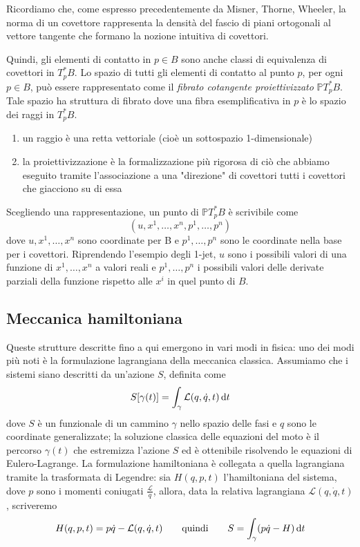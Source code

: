 \begin{remark}
    Ricordiamo che, come espresso precedentemente da \cite[Capitolo 2, Foundations of Special Relativity]{misner-wheeler-thorne_gravitation} Misner, Thorne, Wheeler, la norma di un covettore rappresenta la densità del fascio di piani ortogonali al vettore tangente che formano la nozione intuitiva di covettori.
\end{remark}

Quindi, gli elementi di contatto in $p \in B$ sono anche classi di equivalenza di covettori in $T_p^* B$.
Lo spazio di tutti gli elementi di contatto al punto $p$, per ogni $p \in B$, può essere rappresentato come il \emph{fibrato cotangente proiettivizzato} $\mathbb{P}T_p^* B$.
Tale spazio ha struttura di fibrato dove una fibra esemplificativa in $p$ è lo spazio dei raggi in $T_p^* B$.

\begin{remark}
    \begin{enumerate}
        \item un raggio è una retta vettoriale (cioè un sottospazio 1-dimensionale)
        \item la proiettivizzazione è la formalizzazione più rigorosa di ciò che abbiamo eseguito tramite l'associazione a una "direzione" di covettori tutti i covettori che giacciono su di essa
    \end{enumerate}
\end{remark}
Scegliendo una rappresentazione, un punto di $\mathbb{P}T_p^* B$ è scrivibile come
\[
    (u, x^1, \dots, x^n, p^1, \dots, p^n)
\]
dove $u, x^1, \dots,x^n$ sono coordinate per B e $p^1, \dots, p^n$ sono le coordinate nella base per i covettori.
Riprendendo l'esempio degli 1-jet, $u$ sono i possibili valori di una funzione di $x^1, \dots, x^n$ a valori reali e $p^1, \dots, p^n$ i possibili valori delle derivate parziali della funzione rispetto alle $x^i$ in quel punto di $B$.

\subsection{Meccanica hamiltoniana}

Queste strutture descritte fino a qui emergono in vari modi in fisica: uno dei modi più noti è la formulazione lagrangiana della meccanica classica.
Assumiamo che i sistemi siano descritti da un'azione $S$, definita come
\[
    S[\gamma(t)] = \int_\gamma \mathcal{L} (q, \dot q, t) \odif{t}
\]
dove $S$ è un funzionale di un cammino $\gamma$ nello spazio delle fasi e $q$ sono le coordinate generalizzate; la soluzione classica delle equazioni del moto è il percorso $\gamma(t)$ che estremizza l'azione $S$ ed è ottenibile risolvendo le equazioni di Eulero-Lagrange.
La formulazione hamiltoniana è collegata a quella lagrangiana tramite la trasformata di Legendre: sia $H(q, p, t)$ l'hamiltoniana del sistema, dove $p$ sono i momenti coniugati $\frac{\mathcal{L}}{\dot q}$, allora, data la relativa lagrangiana $\mathcal{L}(q, \dot q, t)$, scriveremo
\[
    H(q, p, t) = p \dot q - \mathcal{L}(q, \dot q, t) \qquad \text{quindi} \qquad S = \int_\gamma (p \dot q - H) \odif{t}
\]

